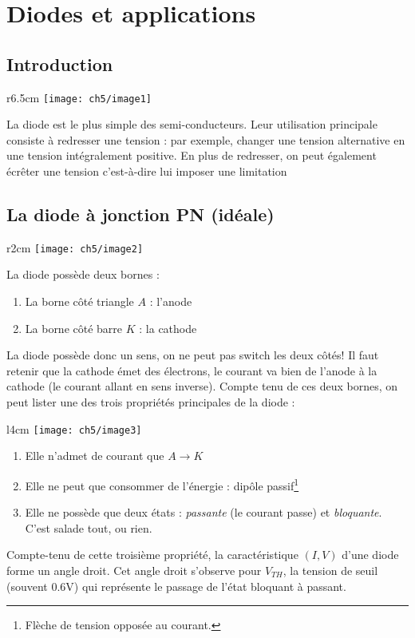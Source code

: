 \chapter{Diodes et applications}

	\section{Introduction}
	\begin{wrapfigure}[6]{r}{6.5cm}
	\vspace{-0.5cm}
	\texttt{[image: ch5/image1]}
	\end{wrapfigure}
	La diode est le plus simple des semi-conducteurs. Leur utilisation principale 
	consiste à redresser une tension : par exemple, changer une tension alternative 
	en une tension intégralement positive. En plus de redresser, on peut également 
	écrêter une tension c'est-à-dire lui imposer une limitation
	
	\section{La diode à jonction PN (idéale)}
	\begin{wrapfigure}[2]{r}{2cm}
	\vspace{-0.5cm}
	\texttt{[image: ch5/image2]}
	\end{wrapfigure}
	La diode possède deux bornes : 
	\begin{enumerate}
	\item La borne côté triangle $A$ : l'anode
	\item La borne côté barre $K$ : la cathode
	\end{enumerate}
	La diode possède donc un sens, on ne peut pas switch les deux côtés! Il faut 
	retenir que la cathode émet des électrons, le courant va bien de l'anode à 
	la cathode (le courant allant en sens inverse). Compte tenu de ces deux bornes, 
	on peut lister une des trois propriétés principales de la diode :
	\begin{wrapfigure}[8]{l}{4cm}
	\vspace{-0.5cm}
	\texttt{[image: ch5/image3]}
	\end{wrapfigure}
	\begin{enumerate}
	\item Elle n'admet de courant que $A \rightarrow K$
	\item Elle ne peut que consommer de l'énergie : dipôle passif\footnote{Flèche de 
	tension opposée au courant.}
	\item Elle ne possède que deux états : \textit{passante} (le courant passe) et 
	\textit{bloquante}. C'est salade tout, ou rien.
	\end{enumerate}
	Compte-tenu de cette troisième propriété, la caractéristique $(I,V)$ d'une diode 
	forme un angle droit. Cet angle droit s'observe pour $V_{TH}$, la tension de 
	seuil (souvent 0.6V) qui représente le passage de l'état bloquant à passant.
	
